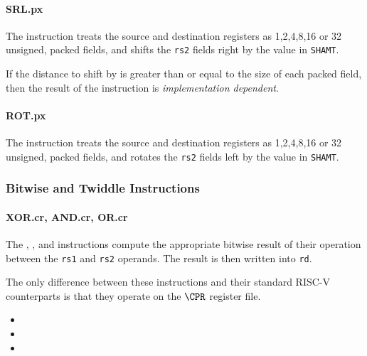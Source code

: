 \paragraph{SRL.px}

The instruction  treats the source and destination registers as
1,2,4,8,16 or 32 unsigned, packed fields, and shifts the {\tt rs2} fields
right by the value in {\tt SHAMT}.

If the distance to shift by is greater than or equal to the size of each
packed field, then the result of the  instruction is
{\em implementation dependent}.

\paragraph{ROT.px}

The instruction  treats the source and destination registers as
1,2,4,8,16 or 32 unsigned, packed fields, and rotates the {\tt rs2} fields
left by the value in {\tt SHAMT}.

\subsubsection{Bitwise and Twiddle Instructions}

\paragraph{XOR.cr, AND.cr, OR.cr}

The , , and  instructions compute the
appropriate bitwise result of their operation between the {\tt rs1} and
{\tt rs2} operands. The result is then written into {\tt rd}.

The only difference between these instructions and their standard RISC-V
counterparts is that they operate on the $\CPR$ register file.

\begin{itemize}
\item {}
\item {}
\item {}
\end{itemize}

